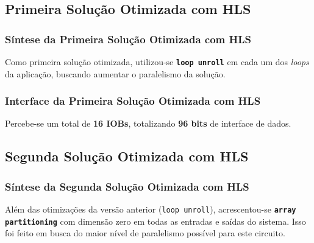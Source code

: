 \documentclass{beamer}
\begin{document}
    \subsection{Primeira Solução Otimizada com HLS}
    \begin{frame}
        \frametitle{Síntese da Primeira Solução Otimizada com HLS}

        \begingroup {}
        Como primeira solução otimizada, utilizou-se \textbf{\texttt{loop unroll}}
        em cada um dos \textit{loops} da aplicação, buscando aumentar o paralelismo
        da solução.
        \endgroup

        \begin{figure}[h] 
            \centering
          \end{figure}
    \end{frame}

    \begin{frame}
        \frametitle{Interface da Primeira Solução Otimizada com HLS}

        \begingroup {}
        Percebe-se um total de \textbf{16 IOBs}, totalizando
        \textbf{96 bits} de interface de dados.
        \endgroup

        \begin{figure}[h] 
            \centering
          \end{figure}
    \end{frame}

    \subsection{Segunda Solução Otimizada com HLS}
    \begin{frame}
        \frametitle{Síntese da Segunda Solução Otimizada com HLS}

        \begingroup {}
        Além das otimizações da versão anterior (\texttt{loop unroll}), acrescentou-se
        \textbf{\texttt{array partitioning}} com dimensão zero em todas as entradas e
        saídas do sistema. Isso foi feito em busca do maior nível de paralelismo possível
        para este circuito.
        \endgroup

        \begin{figure}[h] 
            \centering
          \end{figure}
    \end{frame}
\end{document}
